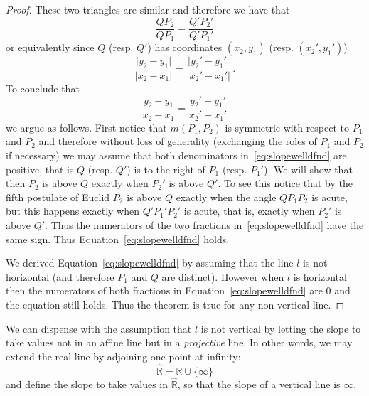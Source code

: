 \documentclass[12pt]{article}
\theoremstyle{definition}
\theoremstyle{remark}
\begin{document}
\begin{proof}
These two triangles are similar and therefore we have that 
$$\frac{QP_2}{QP_1} = \frac{Q'P_2'}{Q'P_1'} $$
or equivalently since $Q$ (resp. $Q'$) has coordinates $(x_2,y_1)$ 
(resp. $(x_2',y_1')$)
$$  \frac{\vert y_2-y_1 \vert }{\vert x_2-x_1 \vert} = \frac{\vert y_2'-y_1'\vert }{\vert x_2'-x_1'\vert}\,.$$
To conclude that 
\begin{equation}
  \label{eq:slopewelldfnd}
  \frac{y_2-y_1}{x_2-x_1} = \frac{y_2'-y_1'}{x_2'-x_1'}
\end{equation}
we argue as follows.  First notice that $m(P_1,P_2)$ is symmetric
with respect to $P_1$ and $P_2$ and therefore without loss of
generality (exchanging the roles of $P_1$ and $P_2$ if necessary) we
may assume that both denominators in~\eqref{eq:slopewelldfnd} are
positive, that is $Q$ (resp. $Q'$) is to the right of $P_1$ (resp.
$P_1'$).  We will show that then $P_2$ is above $Q$ exactly when
$P_2'$ is above $Q'$.  To see this notice that by the fifth
postulate of Euclid $P_2$ is above $Q$ exactly when the angle
$QP_1P_2$ is acute, but this happens exactly when $Q'P_1'P_2'$ is
acute, that is, exactly when $P_2'$ is above $Q'$.  Thus the numerators
of the two fractions in~\eqref{eq:slopewelldfnd} have the same sign.
Thus Equation~\eqref{eq:slopewelldfnd} holds.

We derived Equation~\eqref{eq:slopewelldfnd} by assuming that the
line $l$ is not horizontal (and therefore $P_1$ and $Q$ are
distinct).  However when $l$ is horizontal then the numerators of
both fractions in Equation~\eqref{eq:slopewelldfnd} are $0$ and the
equation still holds.  Thus the theorem is true for any non-vertical
line.
\end{proof}

We can dispense with the assumption that $l$ is not vertical by
letting the slope to take values not in an affine line but in a
\emph{projective} line.  In other words, we may extend the real line 
by adjoining one point at infinity: 
$$\hat{ \mathbb{R} } = \mathbb{R}\cup \{ \infty \}$$
and define the slope to take values in $\hat{\mathbb{R}}$, so that
the slope of a vertical line is $\infty$.
\end{document}
